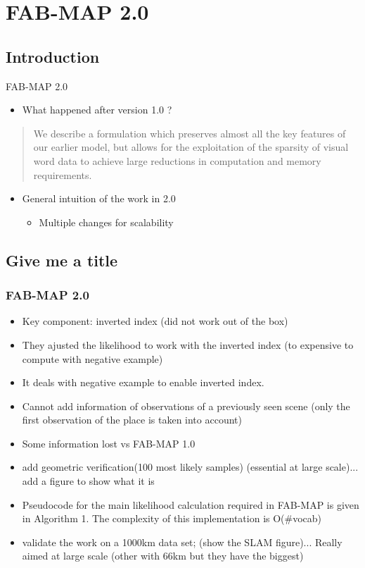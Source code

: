 \section{FAB-MAP 2.0}

\subsection{Introduction}
\begin{frame}{FAB-MAP 2.0}
    \begin{itemize}
        \item What happened after version 1.0 ?
    \end{itemize}
    \begin{quotation}
        We describe a formulation which preserves almost all the key features of our earlier model, but allows for the exploitation of the sparsity of visual word data to achieve large reductions in computation and memory requirements.~\cite{fabmap2011}
    \end{quotation}
    \begin{itemize}
        \item General intuition of the work in 2.0
            \begin{itemize}
                \item Multiple changes for scalability
            \end{itemize}
    \end{itemize}
\end{frame}

\subsection{Give me a title}
\begin{frame}
    \frametitle{FAB-MAP 2.0}
    \begin{itemize}
        \item Key component: inverted index (did not work out of the box)
        \item They ajusted the likelihood to work with the inverted index (to expensive to compute with negative example)
        \item It deals with negative example to enable inverted index.
        \item Cannot add information of observations of a previously seen scene (only the first observation of the place is taken into account)
        \item Some information lost vs FAB-MAP 1.0

        \item add geometric verification(100 most likely samples) (essential at large scale)... add a figure to show what it is
        \item Pseudocode for the main likelihood calculation required in FAB-MAP is given in Algorithm 1. The complexity of this implementation is O(\#vocab)
        \item validate the work on a 1000km data set; (show the SLAM figure)... Really aimed at large scale (other with 66km but they have the biggest)
    \end{itemize}
\end{frame}

